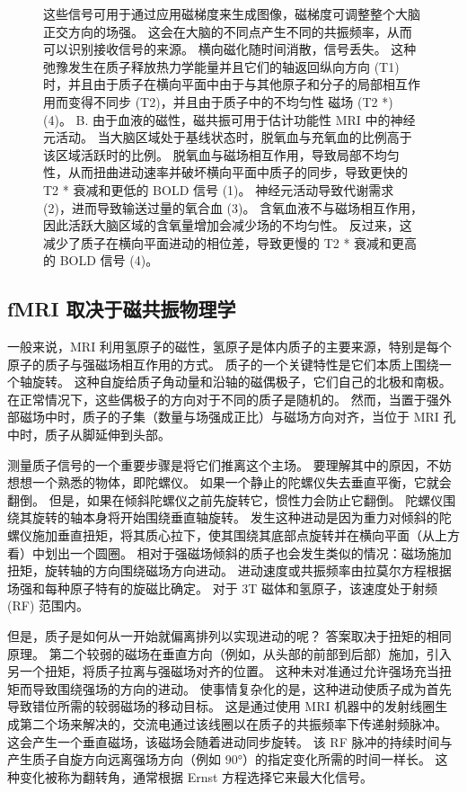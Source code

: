\begin{figure}[htbp]
{		这些信号可用于通过应用磁梯度来生成图像，磁梯度可调整整个大脑正交方向的场强。 
		这会在大脑的不同点产生不同的共振频率，从而可以识别接收信号的来源。 
		横向磁化随时间消散，信号丢失。 
		这种弛豫发生在质子释放热力学能量并且它们的轴返回纵向方向 (T1) 时，并且由于质子在横向平面中由于与其他原子和分子的局部相互作用而变得不同步 (T2)，并且由于质子中的不均匀性 磁场 (T2 *) (4)。 
		B. 由于血液的磁性，磁共振可用于估计功能性 MRI 中的神经元活动。 
		当大脑区域处于基线状态时，脱氧血与充氧血的比例高于该区域活跃时的比例。 
		脱氧血与磁场相互作用，导致局部不均匀性，从而扭曲进动速率并破坏横向平面中质子的同步，导致更快的 T2 * 衰减和更低的 BOLD 信号 (1)。 
		神经元活动导致代谢需求 (2)，进而导致输送过量的氧合血 (3)。 
		含氧血液不与磁场相互作用，因此活跃大脑区域的含氧量增加会减少场的不均匀性。
		反过来，这减少了质子在横向平面进动的相位差，导致更慢的 T2 * 衰减和更高的 BOLD 信号 (4)。}
	\label{fig:6_1}
\end{figure}


\subsection{fMRI 取决于磁共振物理学}
一般来说，MRI 利用氢原子的磁性，氢原子是体内质子的主要来源，特别是每个原子的质子与强磁场相互作用的方式。 
质子的一个关键特性是它们本质上围绕一个轴旋转。 
这种自旋给质子角动量和沿轴的磁偶极子，它们自己的北极和南极。 
在正常情况下，这些偶极子的方向对于不同的质子是随机的。 
然而，当置于强外部磁场中时，质子的子集（数量与场强成正比）与磁场方向对齐，当位于 MRI 孔中时，质子从脚延伸到头部。


测量质子信号的一个重要步骤是将它们推离这个主场。 
要理解其中的原因，不妨想想一个熟悉的物体，即陀螺仪。 
如果一个静止的陀螺仪失去垂直平衡，它就会翻倒。 
但是，如果在倾斜陀螺仪之前先旋转它，惯性力会防止它翻倒。 
陀螺仪围绕其旋转的轴本身将开始围绕垂直轴旋转。 
发生这种进动是因为重力对倾斜的陀螺仪施加垂直扭矩，将其质心拉下，使其围绕其底部点旋转并在横向平面（从上方看）中划出一个圆圈。 
相对于强磁场倾斜的质子也会发生类似的情况：磁场施加扭矩，旋转轴的方向围绕磁场方向进动。 
进动速度或共振频率由拉莫尔方程根据场强和每种原子特有的旋磁比确定。 
对于 3T 磁体和氢原子，该速度处于射频 (RF) 范围内。


但是，质子是如何从一开始就偏离排列以实现进动的呢？ 
答案取决于扭矩的相同原理。 
第二个较弱的磁场在垂直方向（例如，从头部的前部到后部）施加，引入另一个扭矩，将质子拉离与强磁场对齐的位置。 
这种未对准通过允许强场充当扭矩而导致围绕强场的方向的进动。 
使事情复杂化的是，这种进动使质子成为首先导致错位所需的较弱磁场的移动目标。
这是通过使用 MRI 机器中的发射线圈生成第二个场来解决的，交流电通过该线圈以在质子的共振频率下传递射频脉冲。 
这会产生一个垂直磁场，该磁场会随着进动同步旋转。 
该 RF 脉冲的持续时间与产生质子自旋方向远离强场方向（例如 90°）的指定变化所需的时间一样长。 
这种变化被称为翻转角，通常根据 Ernst 方程选择它来最大化信号。


